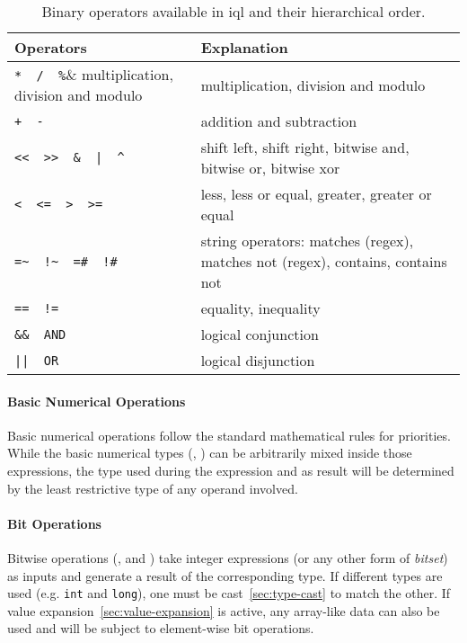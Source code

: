 \documentclass[11pt,a4paper]{article}
\begin{document}
\begin{table}[ht]
	\centering
	\begin{tabular}{|p{}|p{}|}
		\hline 
		\textbf{Operators}	& \textbf{Explanation} \\ 
		\hline 
		\hline
		\verb|*  /  %|& multiplication, division and modulo \\ 
		\hline 
		\verb|+  -|& addition and subtraction \\ 
		\hline 
		\verb#<<  >>  &  |  ^#& shift left, shift right, bitwise and, bitwise or, bitwise xor \\ 
		\hline 
		\verb|<  <=  >  >=|& less, less or equal, greater, greater or equal \\ 
		\hline 
		\verb|=~  !~  =#  !#|& string operators: matches (regex), matches not (regex), contains, contains not \\ 
		\hline 
		\verb|==  !=|& equality, inequality \\ 
		\hline 
		\verb|&&  AND|& logical conjunction \\ 
		\hline 
		\verb#||  OR#& logical disjunction \\ 
		\hline 
	\end{tabular} 
	\caption[Binary operators]{Binary operators available in \ac{iql} and their hierarchical order.}
	\label{tab:binary-operators}
\end{table}

\paragraph{Basic Numerical Operations}
\label{sec:basic-numerical-operations}

Basic numerical operations follow the standard mathematical rules for priorities.
While the basic numerical types (, ) can be arbitrarily mixed inside those expressions, the type used during the expression and as result will be determined by the least restrictive type of any operand involved.

\paragraph{Bit Operations}
\label{sec:bit-operations}

Bitwise operations (\lit{\&}, \lit{|} and \lit{\textasciicircum}) take integer expressions (or any other form of \textit{bitset}) as inputs and generate a result of the corresponding type. If different types are used (e.g. \texttt{int} and \texttt{long}), one must be cast~\ref{sec:type-cast} to match the other. If value expansion~\ref{sec:value-expansion} is active, any array-like data can also be used and will be subject to element-wise bit operations.
\end{document}
